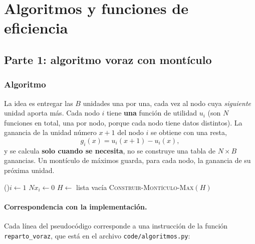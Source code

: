 \section{Algoritmos y funciones de eficiencia}

\subsection{Parte 1: algoritmo voraz con montículo}\label{sec:p1}

\subsubsection{Algoritmo}

La idea es entregar las $B$ unidades una por una, cada vez al nodo cuya \emph{siguiente} unidad aporta más. Cada nodo $i$ tiene \textbf{una} función de utilidad $u_i$ (son $N$ funciones en total, una por nodo, porque cada nodo tiene datos distintos). La ganancia de la unidad número $x+1$ del nodo $i$ se obtiene con una resta,
\[
g_i(x) = u_i(x+1) - u_i(x),
\]
y se calcula \textbf{solo cuando se necesita}, no se construye una tabla de $N\times B$ ganancias. Un montículo de máximos guarda, para cada nodo, la ganancia de su próxima unidad.

\begin{algorithm}[H]
\caption{\textsc{RepartoVoraz}$(N,\ u,\ B)$}\label{alg:reparto}
\lFor(){$i\leftarrow 1$ \KwTo $N$}{$x_i \leftarrow 0$ }
$H \leftarrow$ lista vacía\;
\textsc{Construir-Montículo-Max}$(H)$ 
\;
\end{algorithm}

\paragraph{Correspondencia con la implementación.}
Cada línea del pseudocódigo corresponde a una instrucción de la función \texttt{reparto\_voraz}, que está en el archivo \texttt{code/algoritmos.py}:


